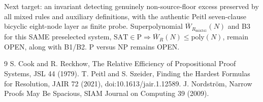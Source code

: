 \documentclass[11pt]{article}
\begin{document}
Next target: an invariant detecting genuinely non-source-floor excess preserved by all mixed rules and auxiliary definitions, with the authentic Peitl seven-clause bicyclic eight-node layer as finite probe. Superpolynomial $\overline W_{R_{\mathrm{mix341}}}(N)$ and B3 for this SAME preselected system, $\mathrm{SAT}\in\mathrm{P}\Rightarrow\overline W_R(N)\le\mathrm{poly}(N)$, remain OPEN, along with B1/B2. P versus NP remains OPEN.
\begin{thebibliography}{9}
 S. Cook and R. Reckhow, The Relative Efficiency of Propositional Proof Systems, JSL 44 (1979).
 T. Peitl and S. Szeider, Finding the Hardest Formulas for Resolution, JAIR 72 (2021), doi:10.1613/jair.1.12589.
 J. Nordstr\"om, Narrow Proofs May Be Spacious, SIAM Journal on Computing 39 (2009).
\end{thebibliography}
\end{document}

